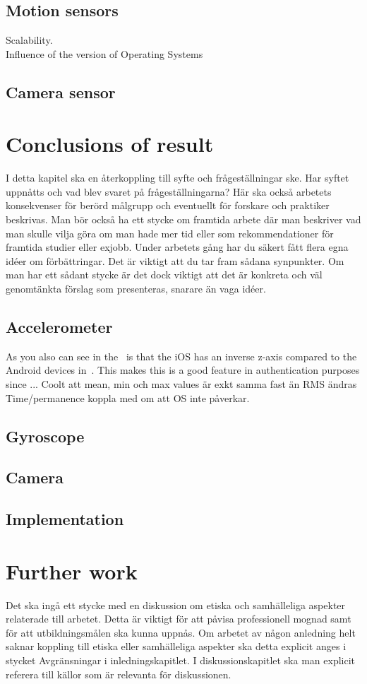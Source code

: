 \subsection{Motion sensors}
Scalability.\\
Influence of the version of Operating Systems \\

\subsection{Camera sensor}


\section{Conclusions of result}\label{sec:conclusion}
I detta kapitel ska en återkoppling till syfte och frågeställningar ske. Har syftet uppnåtts
och vad blev svaret på frågeställningarna? Här ska också arbetets konsekvenser för
berörd målgrupp och eventuellt för forskare och praktiker beskrivas.
Man bör också ha ett stycke om framtida arbete där man beskriver vad man skulle vilja
göra om man hade mer tid eller som rekommendationer för framtida studier eller exjobb.
Under arbetets gång har du säkert fått flera egna idéer om förbättringar. Det är viktigt att
du tar fram sådana synpunkter. Om man har ett sådant stycke är det dock viktigt att det är
konkreta och väl genomtänkta förslag som presenteras, snarare än vaga idéer.
\subsection{Accelerometer}\label{sec:concl:acc}
As you also can see in the~ is that the iOS has an inverse z-axis compared to the Android devices in~. This makes this is a good feature in authentication purposes since ...
Coolt att mean, min och max values är exkt samma fast än RMS ändras
Time/permanence koppla med \cite{sensor:accelPrint} om att OS inte påverkar.
\subsection{Gyroscope}
\subsection{Camera}
\subsection{Implementation}

\section{Further work}
Det ska ingå ett stycke med en diskussion om etiska och samhälleliga aspekter relaterade
till arbetet. Detta är viktigt för att påvisa professionell mognad samt för att utbildningsmålen
ska kunna uppnås. Om arbetet av någon anledning helt saknar koppling till etiska eller
samhälleliga aspekter ska detta explicit anges i stycket Avgränsningar i inledningskapitlet.
I diskussionskapitlet ska man explicit referera till källor som är relevanta för diskussionen.
